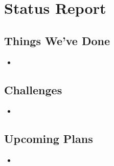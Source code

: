 \documentclass[11pt]{article}
\begin{document}
\section{Status Report} %

\subsection{Things We've Done}
\begin{itemize}
\item
\end{itemize}

\subsection{Challenges}
\begin{itemize}
\item
\end{itemize}

\subsection{Upcoming Plans}
\begin{itemize}
\item
\end{itemize}
\end{document}

